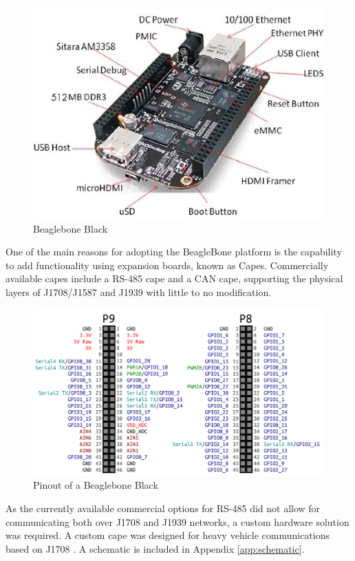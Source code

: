 \begin{figure}[h]
  \centering
  \includegraphics{BeagleBoneBlack}
  \caption{Beaglebone Black}
  \label{fig:BBB}
\end{figure}


One of the main reasons for adopting the BeagleBone platform is the capability to add functionality using expansion boards, known
as Capes. Commercially available capes include a RS-485 cape and a CAN cape, supporting the physical layers of J1708/J1587 and J1939
with little to no modification.


\begin{figure}[h]
  \centering
  \includegraphics{BeaglebonePinout}
  \caption{Pinout of a Beaglebone Black}
  \label{fig:BBB-pinout}
\end{figure}


As the currently available commercial options for RS-485 did not allow for communicating both over J1708 and J1939 networks, a custom
hardware solution was required. A custom cape was designed for heavy vehicle communications based on J1708 \cite{J1708}. A schematic is included in 
Appendix \ref{app:schematic}.

